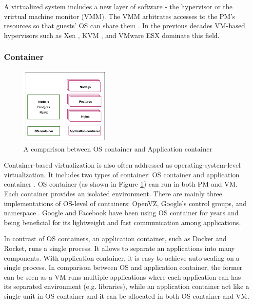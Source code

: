 A virtualized system includes a new layer of software - the hypervisor or the vrirtual machine monitor (VMM). The VMM arbitrates accesses to the PM's resources so that guests' OS can share them \cite{vm_technology}. In the previous decades VM-based hypervisors such as Xen \cite{Barham:2003cj}, KVM \cite{Kivity:2007wu}, and VMware ESX \cite{Waldspurger:2002db} dominate this field.


\subsubsection{Container}

\begin{figure}
	\centering
	\includegraphics[width=0.4\textwidth]{pics/container_OS_APP.png}
	\caption{A comparison between OS container and Application container \cite{Piraghaj:2017vi}}
	\label{fig:comparison_container}
\end{figure}

Container-based virtualization is also often addressed as 
operating-system-level virtualization. It includes two types of container: OS container and application container \cite{Piraghaj:2017vi}. OS container (as shown in Figure \ref{fig:comparison_container}) can run in both PM and VM. Each container provides an isolated environment. There are mainly three implementations of OS-level of containers: OpenVZ, Google's control groups, and namespace \cite{Rosen:2013wt}.
Google and Facebook have been using OS container for years and being beneficial for its lightweight and fast communication among applications.

In contrast of OS containers, an application container, such as Docker and Rocket, runs a single process. It allows to separate an applications into many components. With application container, it is easy to achieve auto-scaling on a single process. In comparison between OS and application container, the former can be seen as a VM runs multiple applications where each application can has its separated environment (e.g. libraries), while an application container act like a single unit in OS container and it can be allocated in both OS container and VM.

